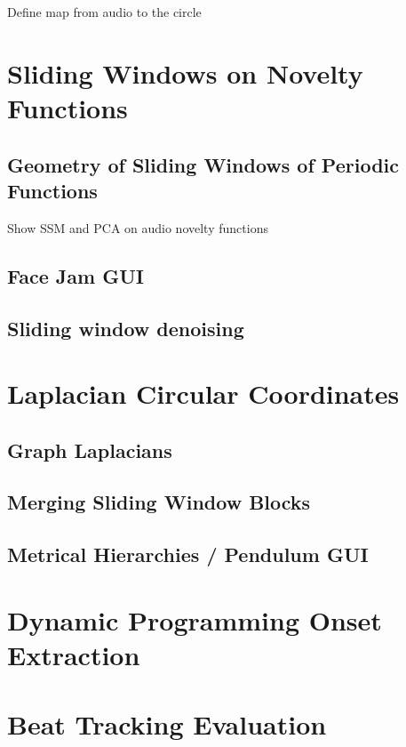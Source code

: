 \documentclass{article}
\begin{document}
Define map from audio to the circle

\section{Sliding Windows on Novelty Functions}

\subsection{Geometry of Sliding Windows of Periodic Functions}

Show SSM and PCA on audio novelty functions

\subsection{Face Jam GUI}

\subsection{Sliding window denoising}


\section{Laplacian Circular Coordinates}

\subsection{Graph Laplacians}

\subsection{Merging Sliding Window Blocks}

\subsection{Metrical Hierarchies / Pendulum GUI}


\section{Dynamic Programming Onset Extraction}


\section{Beat Tracking Evaluation}






\end{document}
